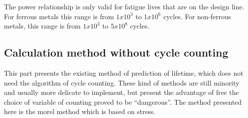 \documentclass[3p,times,procedia,number]{elsarticle}
\begin{document}
The power relationship is only valid for fatigue lives that are on the design line. For ferrous metals this range is from $1x10^3$ to $1x10^6$ cycles. For non-ferrous metals, this range is from
$1x10^3$ to $5x10^8$ cycles. 
         
\subsection{Calculation method without cycle counting}
This part presents the existing method of prediction of lifetime, which does not need the algorithm of cycle counting. These kind of methods are still minority and usually more delicate to implement, but present the advantage of free the choice of variable of counting proved to be ``dangerous''. The method presented here is the morel method which is based on stress.
\end{document}
